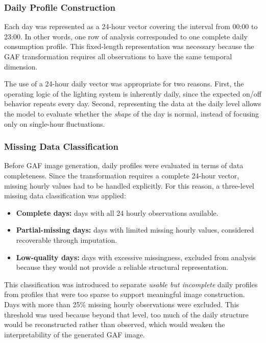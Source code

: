 \documentclass{article}
\begin{document}
\subsubsection{Daily Profile Construction}

Each day was represented as a 24-hour vector covering the interval from 00:00 to 23:00. In other words, one row of analysis corresponded to one complete daily consumption profile. This fixed-length representation was necessary because the GAF transformation requires all observations to have the same temporal dimension.

The use of a 24-hour daily vector was appropriate for two reasons. First, the operating logic of the lighting system is inherently daily, since the expected on/off behavior repeats every day. Second, representing the data at the daily level allows the model to evaluate whether the \emph{shape} of the day is normal, instead of focusing only on single-hour fluctuations.

\subsubsection{Missing Data Classification}

Before GAF image generation, daily profiles were evaluated in terms of data completeness. Since the transformation requires a complete 24-hour vector, missing hourly values had to be handled explicitly. For this reason, a three-level missing data classification was applied:

\begin{itemize}
    \item \textbf{Complete days:} days with all 24 hourly observations available.
    \item \textbf{Partial-missing days:} days with limited missing hourly values, considered recoverable through imputation.
    \item \textbf{Low-quality days:} days with excessive missingness, excluded from analysis because they would not provide a reliable structural representation.
\end{itemize}

This classification was introduced to separate \emph{usable but incomplete} daily profiles from profiles that were too sparse to support meaningful image construction. Days with more than 25\% missing hourly observations were excluded. This threshold was used because beyond that level, too much of the daily structure would be reconstructed rather than observed, which would weaken the interpretability of the generated GAF image.
\end{document}
